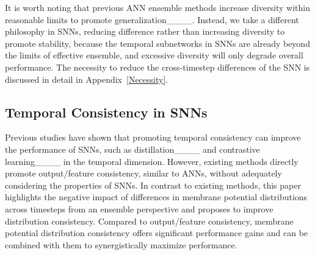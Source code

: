 It is worth noting that previous ANN ensemble methods increase diversity within reasonable limits to promote generalization____. Instead, we take a different philosophy in SNNs, reducing difference rather than increasing diversity to promote stability, because the temporal subnetworks in SNNs are already beyond the limits of effective ensemble, and excessive diversity will only degrade overall performance. The necessity to reduce the cross-timestep differences of the SNN is discussed in detail in Appendix~\ref{Necessity}.

\vspace{-0.1cm}
\subsection{Temporal Consistency in SNNs}
\vspace{-0.1cm}

Previous studies have shown that promoting temporal consistency can improve the performance of SNNs, such as distillation____ and contrastive learning____ in the temporal dimension. However, existing methods directly promote output/feature consistency, similar to ANNs, without adequately considering the properties of SNNs. In contrast to existing methods, this paper highlights the negative impact of differences in membrane potential distributions across timesteps from an ensemble perspective and proposes to improve distribution consistency. Compared to output/feature consistency, membrane potential distribution consistency offers significant performance gains and can be combined with them to synergistically maximize performance.

\vspace{-0.2cm}